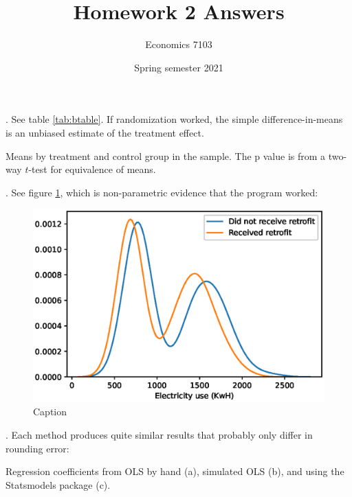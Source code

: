 \documentclass{article}
\title{Homework 2 Answers}
\author{Economics 7103}
\date{Spring semester 2021}
\begin{document}
  
\maketitle

. See table \ref{tab:btable}.  If randomization worked, the simple difference-in-means is an unbiased estimate of the treatment effect.
\begin{table}[h]
    \centering
    
    \caption{Means by treatment and control group in the sample.  The p value is from a two-way $t$-test for equivalence of means.}
    \label{tab:btable}
\end{table}

. See figure \ref{fig:treatmenthist}, which is non-parametric evidence that the program worked:
\begin{figure}[h]
    \centering
    \includegraphics{treatmenthist.eps}
    \caption{Caption}
    \label{fig:treatmenthist}
\end{figure}

. Each method produces quite similar results that probably only differ in rounding error:
\begin{table}[h]
    \centering
   
    \caption{Regression coefficients from OLS by hand (a), simulated OLS (b), and using the Statsmodels package (c).}
    \label{tab:outputtable3}
\end{table}
\end{document}
